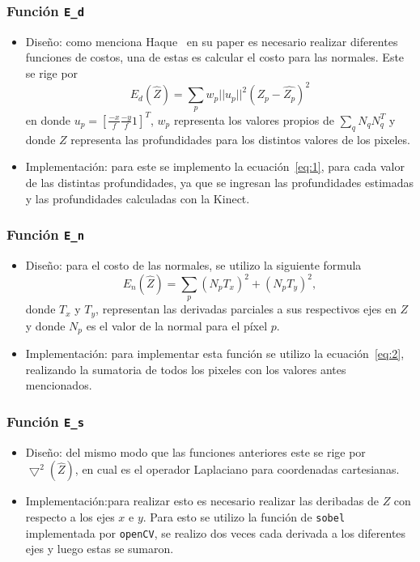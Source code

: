 \documentclass[twocolumn,11pts]{IEEEtran}
\begin{document}
\subsubsection{Función \texttt{E\_d}}
\begin{itemize}
\item Diseño: como menciona Haque~\cite{ourpaper} en su paper es necesario realizar diferentes funciones de costos, una de estas es calcular el costo para las normales. Este se rige por
\begin{equation} \label{eq:1}
E_d(\hat{Z})= \sum_{p} w_p ||u_p||^{2}(Z_{p}-\hat{Z_p})^{2}
\end{equation}
en donde $u_p=[ {\frac{-x}{f}}  {\frac{-y}{f}}  1]^{T}$, $w_p$ representa los valores propios de $\sum_q N_{q}N_{q}^{T}$ y donde $Z$ representa las profundidades para los distintos valores de los pixeles.
\item Implementación: para este se implemento la ecuación~\ref{eq:1}, para cada valor de las distintas profundidades, ya que se ingresan las profundidades estimadas y las profundidades calculadas con la Kinect.
\end{itemize}
\subsubsection{Función \texttt{E\_n}}
\begin{itemize}
\item Diseño: para el costo de las normales, se utilizo la siguiente formula
\begin{equation} \label{eq:2}
E_n(\hat{Z})= \sum_{p} (N_p T_x)^2 + (N_p T_y)^2,
\end{equation}
donde $T_x$ y $T_y$, representan las derivadas parciales a sus respectivos ejes en $Z$ y donde $N_p$  es el valor de la normal para el píxel $p$.
\item Implementación: para implementar esta función se utilizo la ecuación~\ref{eq:2}, realizando la sumatoria de todos los pixeles con los valores antes mencionados.
\end{itemize}
\subsubsection{Función \texttt{E\_s}}
\begin{itemize}
\item Diseño: del mismo modo que las funciones anteriores este se rige por $\bigtriangledown^2(\hat{Z})$, en cual es el operador Laplaciano para coordenadas cartesianas.
\item Implementación:para realizar esto es necesario realizar las deribadas de $Z$ con respecto a los ejes $x$ e $y$. Para esto se utilizo la función de \texttt{sobel} implementada por \texttt{openCV}, se realizo dos veces cada derivada a los diferentes ejes y luego estas se sumaron.
\end{itemize}
\end{document}
